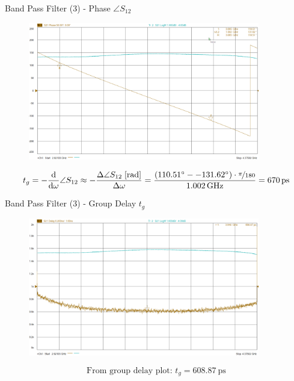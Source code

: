 \documentclass{beamer}
\begin{document}
\begin{frame}[t,fragile]{Band Pass Filter (3) - Phase $\angle S_{12}$}
\begin{figure}
  \centering
  \includegraphics[width=0.9\textwidth]{img/bandpass_phase.png}
\end{figure}
\begin{equation*}
t_g = - \frac{\text{d}}{\text{d}\omega} \angle S_{12} \approx -\frac{\Delta \angle S_{12} \;[\si{\radian}]}{\Delta \omega} = \frac{(\SI{110.51}{\degree}-\SI{-131.62}{\degree})\cdot \nicefrac{\pi}{180}}{\SI{1.002}{\GHz}} = \SI{670}{\pico\second}
\end{equation*}
\end{frame}

\begin{frame}[t,fragile]{Band Pass Filter (3) - Group Delay $t_g$}
\begin{figure}
  \centering
  \includegraphics[width=0.9\textwidth]{img/bandpass_groupdelay.png}
\end{figure}
\begin{equation*}
\text{From group delay plot: }t_g = \SI{608.87}{\pico\second}
\end{equation*}
\end{frame}
\end{document}
